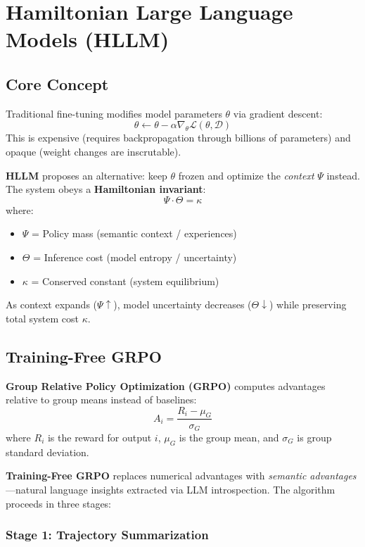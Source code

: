 \section{Hamiltonian Large Language Models (HLLM)}


\subsection{Core Concept}

Traditional fine-tuning modifies model parameters $\theta$ via gradient descent:
\[
\theta \leftarrow \theta - \alpha \nabla_\theta \mathcal{L}(\theta, \mathcal{D})
\]
This is expensive (requires backpropagation through billions of parameters) and opaque (weight changes are inscrutable).

\textbf{HLLM} \cite{zoo2025hllm} proposes an alternative: keep $\theta$ frozen and optimize the \textit{context} $\Psi$ instead. The system obeys a \textbf{Hamiltonian invariant}:
\[
\Psi \cdot \Theta = \kappa
\]
where:
\begin{itemize}
\item $\Psi$ = Policy mass (semantic context / experiences)
\item $\Theta$ = Inference cost (model entropy / uncertainty)
\item $\kappa$ = Conserved constant (system equilibrium)
\end{itemize}

As context expands ($\Psi \uparrow$), model uncertainty decreases ($\Theta \downarrow$) while preserving total system cost $\kappa$.

\subsection{Training-Free GRPO}

\textbf{Group Relative Policy Optimization (GRPO)} \cite{shao2024deepseekmath} computes advantages relative to group means instead of baselines:
\[
A_i = \frac{R_i - \mu_G}{\sigma_G}
\]
where $R_i$ is the reward for output $i$, $\mu_G$ is the group mean, and $\sigma_G$ is group standard deviation.

\textbf{Training-Free GRPO} \cite{tencent2025grpo} replaces numerical advantages with \textit{semantic advantages}—natural language insights extracted via LLM introspection. The algorithm proceeds in three stages:

\subsubsection{Stage 1: Trajectory Summarization}

